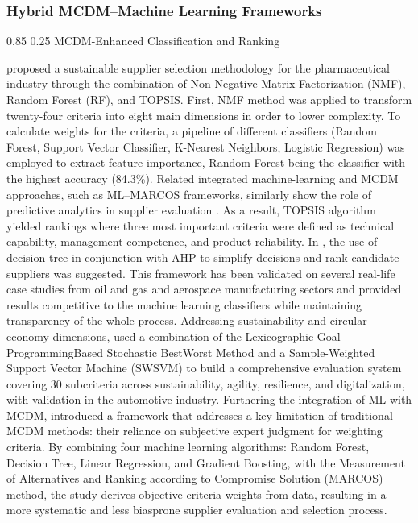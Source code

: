 \documentclass[11pt]{article}
\makeatletter
\renewcommand\paragraph{\@startsection{paragraph}{4}{\z@}%
  {0.85\baselineskip}%
  {0.25\baselineskip}%
  {\normalfont\normalsize\bfseries}}
\makeatother
\begin{document}
\subsubsection{Hybrid MCDM--Machine Learning Frameworks}

\paragraph{MCDM-Enhanced Classification and Ranking}


\cite{ref42a} proposed a sustainable supplier selection methodology for the pharmaceutical industry through the combination of Non-Negative Matrix Factorization (NMF), Random Forest (RF), and TOPSIS. First, NMF method was applied to transform twenty-four criteria into eight main dimensions in order to lower complexity. To calculate weights for the criteria, a pipeline of different classifiers (Random Forest, Support Vector Classifier, K-Nearest Neighbors, Logistic Regression) was employed to extract feature importance, Random Forest being the classifier with the highest accuracy (84.3\%). Related integrated machine-learning and MCDM approaches, such as ML--MARCOS frameworks, similarly show the role of predictive analytics in supplier evaluation \cite{ref72}. As a result, TOPSIS algorithm yielded rankings where three most important criteria were defined as technical capability, management competence, and product reliability. In \cite{ref43}, the use of decision tree in conjunction with AHP to simplify decisions and rank candidate suppliers was suggested. This framework has been validated on several real-life case studies from oil and gas and aerospace manufacturing sectors and provided results competitive to the machine learning classifiers while maintaining transparency of the whole process.
Addressing sustainability and circular economy dimensions, \cite{ref44} used a combination of the Lexicographic Goal ProgrammingBased Stochastic BestWorst Method and a Sample-Weighted Support Vector Machine (SWSVM) to build a comprehensive evaluation system covering 30 subcriteria across sustainability, agility, resilience, and digitalization, with validation in the automotive industry. Furthering the integration of ML with MCDM, \cite{ref41} introduced a framework that addresses a key limitation of traditional MCDM methods: their reliance on subjective expert judgment for weighting criteria. By combining four machine learning algorithms: Random Forest, Decision Tree, Linear Regression, and Gradient Boosting, with the Measurement of Alternatives and Ranking according to Compromise Solution (MARCOS) method, the study derives objective criteria weights from data, resulting in a more systematic and less biasprone supplier evaluation and selection process.
\end{document}
